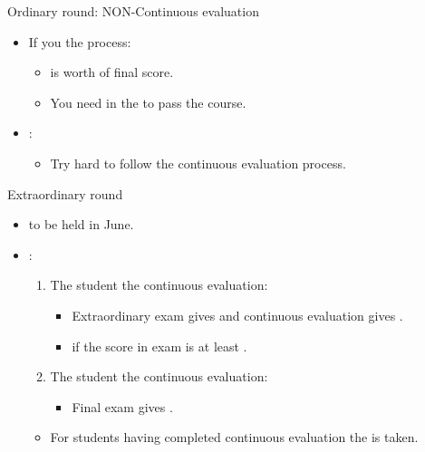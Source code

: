 \begin{frame}[t]{Ordinary round: NON-Continuous evaluation}
\begin{itemize}
  \item If you  the  process:
    \begin{itemize}
      \item {} is worth  of final score.
      \item You need  in the  to pass the course.
    \end{itemize}

  \item {}:
    \begin{itemize}
      \item Try hard to follow the continuous evaluation process.
    \end{itemize}
\end{itemize}
\end{frame}


\begin{frame}[t]{Extraordinary round}
\begin{itemize}
  \item {} to be held in June.

  \item {}:
    \begin{enumerate}
      \item The student  the continuous evaluation:
        \begin{itemize}
          \item Extraordinary exam gives  
                and continuous evaluation gives .
          \item {} if the score in exam is at least .
        \end{itemize}
      \item The student  the continuous evaluation: 
        \begin{itemize}
          \item Final exam gives .
        \end{itemize}
    \end{enumerate}

    \begin{itemize}
      \item For students having completed continuous evaluation 
            the  is taken.
    \end{itemize}
\end{itemize}
\end{frame}

